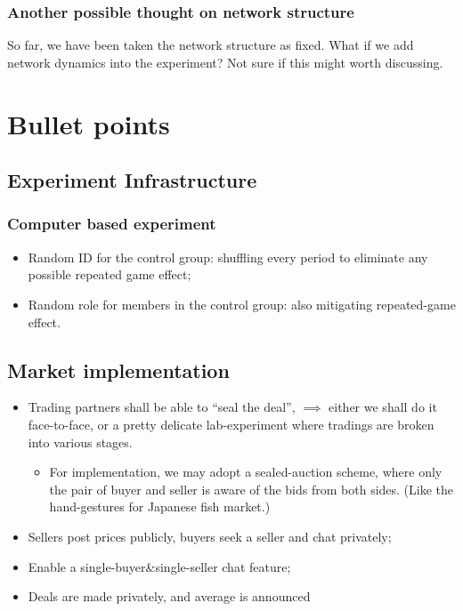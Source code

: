 \subsubsection{Another possible thought on network structure}

So far, we have been taken the network structure as fixed. What if we add
network dynamics into the experiment? Not sure if this might worth discussing.

\section{Bullet points}

\subsection{Experiment Infrastructure}

\subsubsection{Computer based experiment}

\begin{itemize}
    \item Random ID for the control group: shuffling every period to eliminate
    any possible repeated game effect;
    \item Random role for members in the control group: also mitigating
    repeated-game effect.
\end{itemize}


\subsection{Market implementation}

\begin{itemize}
    \item Trading partners shall be able to ``seal the deal'', $\implies$ either we
    shall do it face-to-face, or a pretty delicate lab-experiment where tradings are
    broken into various stages.
    \begin{itemize}
        \item For implementation, we may adopt a sealed-auction scheme, where only the
        pair of buyer and seller is aware of the bids from both sides. (Like the hand-gestures
        for Japanese fish market.)
    \end{itemize}
    \item Sellers post prices publicly, buyers seek a seller and chat privately;
    \item Enable a single-buyer\&single-seller chat feature;
    \item Deals are made privately, and average is announced
\end{itemize}

